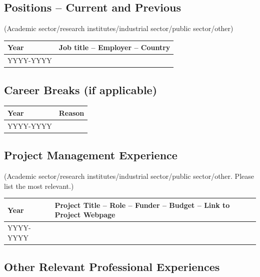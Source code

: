 \documentclass[draftproposal,pncdic]{pncdi-pd}
\begin{document}
\subsection*{Positions -- Current and Previous}

\begin{pncdiexplanation}
(Academic sector/research institutes/industrial sector/public sector/other)
\end{pncdiexplanation}

{
\noindent \begin{tabular}{|m{}|m{}|} \hline
\rowcolor{PNCDITableLightGray}
Year & Job title -- Employer -- Country
\\\hline

YYYY-YYYY &
\\\hline
\end{tabular}
}

\subsection*{Career Breaks (if applicable)}

{
\noindent \begin{tabular}{|m{}|m{}|} \hline
\rowcolor{PNCDITableLightGray}
Year & Reason
\\\hline

YYYY-YYYY &
\\\hline
\end{tabular}
}

\subsection*{Project Management Experience}

\begin{pncdiexplanation}
(Academic sector/research institutes/industrial sector/public sector/other. Please list
the most relevant.)
\end{pncdiexplanation}

{
\noindent \begin{tabular}{|m{}|m{}|} \hline
\rowcolor{PNCDITableLightGray}
Year & Project Title -- Role -- Funder -- Budget -- Link to Project Webpage
\\\hline

YYYY-YYYY &
\\\hline
\end{tabular}
}

\subsection*{Other Relevant Professional Experiences}
\end{document}
